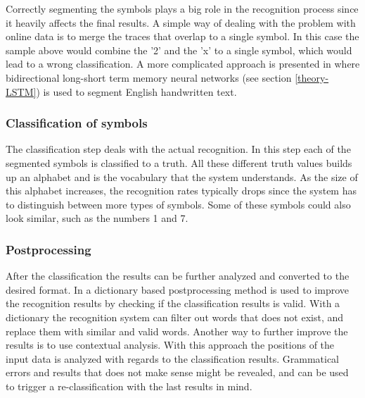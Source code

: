 Correctly segmenting the symbols plays a big role in the recognition process since it heavily affects the final results. A simple way of dealing with the problem with online data is to merge the traces that overlap to a single symbol. In this case the sample above would combine the '2' and the 'x' to a single symbol, which would lead to a wrong classification. A more complicated approach is presented in \cite{nguyen_improved_2015} where bidirectional long-short term memory neural networks (see section \ref{theory-LSTM}) is used to segment English handwritten text.

\subsubsection{Classification of symbols}
The classification step deals with the actual recognition. In this step each of the segmented symbols is classified to a truth. All these different truth values builds up an alphabet and is the vocabulary that the system understands. As the size of this alphabet increases, the recognition rates typically drops since the system has to distinguish between more types of symbols. Some of these symbols could also look similar, such as the numbers 1 and 7. 


\subsubsection{Postprocessing}

After the classification the results can be further analyzed and converted to the desired format. In \cite{hu_research_2011} a dictionary based postprocessing method is used to improve the recognition results by checking if the classification results is valid. With a dictionary the recognition system can filter out words that does not exist, and replace them with similar and valid words. Another way to further improve the results is to use contextual analysis. With this approach the positions of the input data is analyzed with regards to the classification results. Grammatical errors and results that does not make sense might be revealed, and can be used to trigger a re-classification with the last results in mind.


